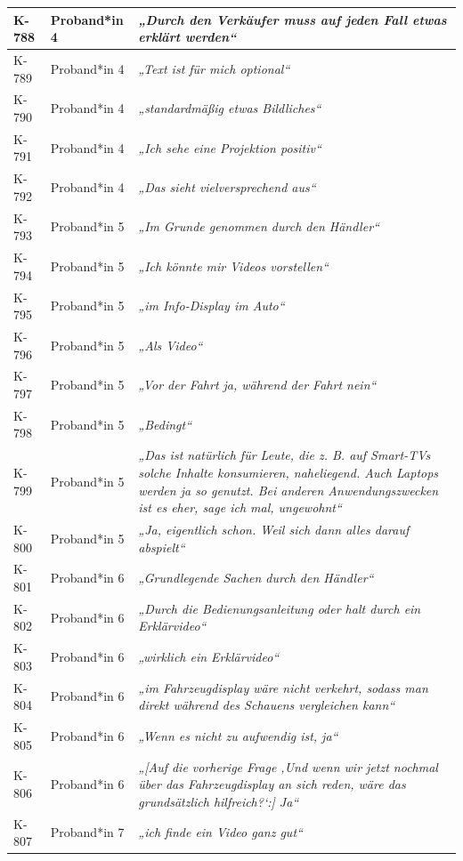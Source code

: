 {\begin{xltabular}{\textwidth}{
    |P{0.10\textwidth}
    |P{0.17\textwidth}
    |Y|
}
\hline
K-788 & Proband*in 4 & \textit{„Durch den Verkäufer muss auf jeden Fall etwas erklärt werden“} \\
\hline
K-789 & Proband*in 4 & \textit{„Text ist für mich optional“} \\
\hline
K-790 & Proband*in 4 & \textit{„standardmäßig etwas Bildliches“} \\
\hline
K-791 & Proband*in 4 & \textit{„Ich sehe eine Projektion positiv“} \\
\hline
K-792 & Proband*in 4 & \textit{„Das sieht vielversprechend aus“} \\
\hline
K-793 & Proband*in 5 & \textit{„Im Grunde genommen durch den Händler“} \\
\hline
K-794 & Proband*in 5 & \textit{„Ich könnte mir Videos vorstellen“} \\
\hline
K-795 & Proband*in 5 & \textit{„im Info-Display im Auto“} \\
\hline
K-796 & Proband*in 5 & \textit{„Als Video“} \\
\hline
K-797 & Proband*in 5 & \textit{„Vor der Fahrt ja, während der Fahrt nein“} \\
\hline
K-798 & Proband*in 5 & \textit{„Bedingt“} \\
\hline
K-799 & Proband*in 5 & \textit{„Das ist natürlich für Leute, die z. B. auf Smart-TVs solche Inhalte konsumieren, naheliegend. Auch Laptops werden ja so genutzt. Bei anderen Anwendungszwecken ist es eher, sage ich mal, ungewohnt“} \\
\hline
K-800 & Proband*in 5 & \textit{„Ja, eigentlich schon. Weil sich dann alles darauf abspielt“} \\
\hline
K-801 & Proband*in 6 & \textit{„Grundlegende Sachen durch den Händler“} \\
\hline
K-802 & Proband*in 6 & \textit{„Durch die Bedienungsanleitung oder halt durch ein Erklärvideo“} \\
\hline
K-803 & Proband*in 6 & \textit{„wirklich ein Erklärvideo“} \\
\hline
K-804 & Proband*in 6 & \textit{„im Fahrzeugdisplay wäre nicht verkehrt, sodass man direkt während des Schauens vergleichen kann“} \\
\hline
K-805 & Proband*in 6 & \textit{„Wenn es nicht zu aufwendig ist, ja“} \\
\hline
K-806 & Proband*in 6 & \textit{„[Auf die vorherige Frage ‚Und wenn wir jetzt nochmal über das Fahrzeugdisplay an sich reden, wäre das grundsätzlich hilfreich?‘:] Ja“} \\
\hline
K-807 & Proband*in 7 & \textit{„ich finde ein Video ganz gut“} \\

\end{xltabular}}
